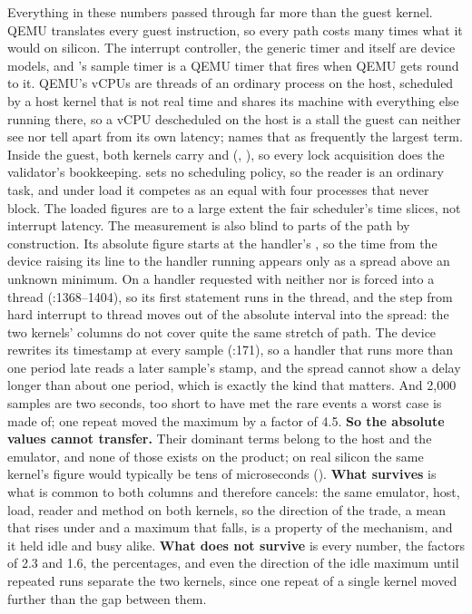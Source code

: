  Everything in these numbers passed through far more than the guest kernel. QEMU translates
every guest instruction, so every path costs many times what it would on silicon. The interrupt
controller, the generic timer and  itself are device models, and 's sample
timer is a QEMU timer that fires when QEMU gets round to it. QEMU's vCPUs are threads of an ordinary
process on the host, scheduled by a host kernel that is not real time and shares its machine with
everything else running there, so a vCPU descheduled on the host is a stall the guest can neither
see nor tell apart from its own latency;  names that as frequently the largest
term. Inside the guest, both kernels carry  and
 (, ), so every lock
acquisition does the validator's bookkeeping.  sets no scheduling policy, so
the reader is an ordinary  task, and under load it competes as an equal with four
processes that never block. The loaded figures are to a large extent the fair scheduler's time
slices, not interrupt latency. The measurement is also blind to parts of the path by construction.
Its absolute figure starts at the handler's , so the time from the device
raising its line to the handler running appears only as a spread above an unknown minimum. On
 a handler requested with neither  nor  is
forced into a thread (:1368--1404), so its first statement runs in the
thread, and the step from hard interrupt to thread moves out of the absolute interval into the
spread: the two kernels' columns do not cover quite the same stretch of path. The device rewrites
its timestamp at every sample (:171), so a handler that runs more than
one period late reads a later sample's stamp, and the spread cannot show a delay longer than about
one period, which is exactly the kind that matters. And 2,000 samples are two seconds, too short to
have met the rare events a worst case is made of; one repeat moved the maximum by a factor of 4.5.
\textbf{So the absolute values cannot transfer.} Their dominant terms belong to the host and the
emulator, and none of those exists on the product; on real silicon the same kernel's figure would
typically be tens of microseconds (). \textbf{What survives} is what is common to
both columns and therefore cancels: the same emulator, host, load, reader and method on both
kernels, so the direction of the trade, a mean that rises under  and a maximum
that falls, is a property of the mechanism, and it held idle and busy alike. \textbf{What does not
survive} is every number, the factors of 2.3 and 1.6, the percentages, and even the direction of
the idle maximum until repeated runs separate the two kernels, since one repeat of a single kernel
moved further than the gap between them.

